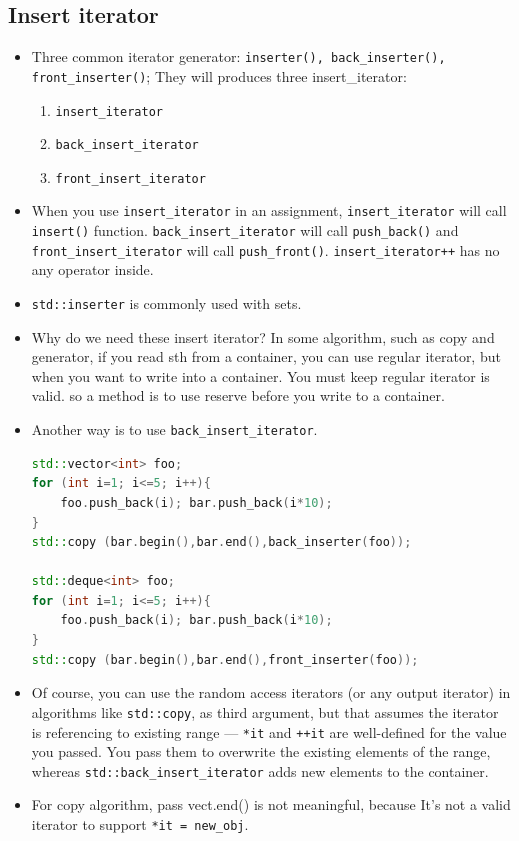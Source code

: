 \documentclass[a4paper,11pt,twoside]{book}
\begin{document}
\subsection{Insert iterator}
\begin{itemize}
\item Three common iterator generator: \texttt{inserter(), back\_inserter(), front\_inserter()};  They will produces three insert\_iterator:
\begin{enumerate}
	\item \texttt{insert\_iterator}
	\item \texttt{back\_insert\_iterator}
	\item \texttt{front\_insert\_iterator}
\end{enumerate}

	\item When you use \texttt{insert\_iterator} in an assignment, \texttt{insert\_iterator} will call \texttt{insert()} function.  \newline 
\texttt{back\_insert\_iterator} will call \texttt{push\_back()} and \texttt{front\_insert\_iterator} will call \texttt{push\_front()}. \texttt{insert\_iterator++} has no any operator inside.

	\item  \texttt{std::inserter} is commonly used with sets.

	\item Why do we need these insert iterator? In some algorithm, such as copy and generator, if you read sth from a container, you can use regular iterator, but when you want to write into a container.  You must keep regular iterator is valid. so a method is to use reserve before you write to a container.


	\item Another way is to use \texttt{back\_insert\_iterator}.
\begin{lstlisting}[frame=single, language=c++]
std::vector<int> foo;
for (int i=1; i<=5; i++){ 
	foo.push_back(i); bar.push_back(i*10); 
}
std::copy (bar.begin(),bar.end(),back_inserter(foo));

std::deque<int> foo;
for (int i=1; i<=5; i++){ 
	foo.push_back(i); bar.push_back(i*10); 
}
std::copy (bar.begin(),bar.end(),front_inserter(foo));
\end{lstlisting}

\item Of course, you can use the random access iterators (or any output iterator) in algorithms like \texttt{std::copy}, as third argument, but that assumes the iterator is referencing to existing range — \texttt{*it} and \texttt{++it} are well-defined for the value you passed. You pass them to overwrite the existing elements of the range, whereas \texttt{std::back\_insert\_iterator} adds new elements to the container.

\item For copy algorithm, pass vect.end() is not meaningful, because It's not a valid iterator to support \texttt{*it = new\_obj}.

\end{itemize}
\end{document}
